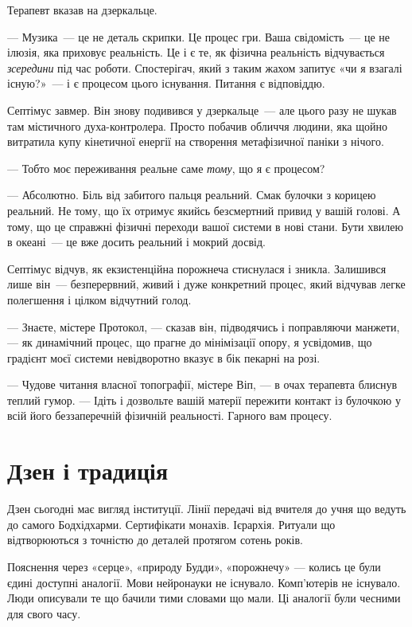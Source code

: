 \documentclass[12pt, a4paper, openany]{book}
\begin{document}
\begin{realitybox}
\medskip
Терапевт вказав на дзеркальце.

--- Музика~--- це не деталь скрипки. Це процес гри. Ваша свідомість~--- це не ілюзія, яка приховує реальність. Це і є те, як фізична реальність відчувається \textit{зсередини} під час роботи. Спостерігач, який з таким жахом запитує «чи я взагалі існую?»~--- і є процесом цього існування. Питання є відповіддю.

\medskip
Септімус завмер. Він знову подивився у дзеркальце~--- але цього разу не шукав там містичного духа-контролера. Просто побачив обличчя людини, яка щойно витратила купу кінетичної енергії на створення метафізичної паніки з нічого.

--- Тобто моє переживання реальне саме \textit{тому}, що я є процесом?

--- Абсолютно. Біль від забитого пальця реальний. Смак булочки з корицею реальний. Не тому, що їх отримує якийсь безсмертний привид у вашій голові. А тому, що це справжні фізичні переходи вашої системи в нові стани. Бути хвилею в океані~--- це вже досить реальний і мокрий досвід.

\medskip
Септімус відчув, як екзистенційна порожнеча стиснулася і зникла. Залишився лише він~--- безперервний, живий і дуже конкретний процес, який відчував легке полегшення і цілком відчутний голод.

--- Знаєте, містере Протокол, --- сказав він, підводячись і поправляючи манжети, --- як динамічний процес, що прагне до мінімізації опору, я усвідомив, що градієнт моєї системи невідворотно вказує в бік пекарні на розі.

--- Чудове читання власної топографії, містере Віп, --- в очах терапевта блиснув теплий гумор. --- Ідіть і дозвольте вашій матерії пережити контакт із булочкою у всій його беззаперечній фізичній реальності. Гарного вам процесу.
\end{realitybox}

\chapter{Дзен і традиція}

Дзен сьогодні має вигляд інституції. Лінії передачі від вчителя до учня що ведуть до самого Бодхідхарми. Сертифікати монахів. Ієрархія. Ритуали що відтворюються з точністю до деталей протягом сотень років.

Пояснення через «серце», «природу Будди», «порожнечу» --- колись це були єдині доступні аналогії. Мови нейронауки не існувало. Комп'ютерів не існувало. Люди описували те що бачили тими словами що мали. Ці аналогії були чесними для свого часу.
\end{document}
